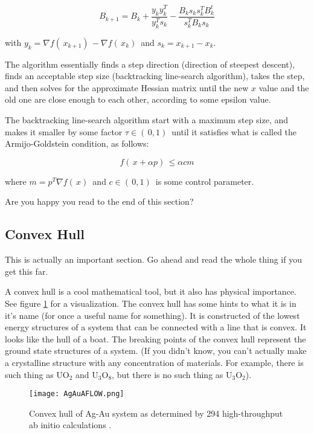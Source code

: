\documentclass{article}
\begin{document}
\begin{equation}
  B_{k+1}= B_k + \frac{y_k y_k^T}{y_k^T s_k} - \frac{B_k s_k s_k^T
    B_k^t}{s_k^T B_k s_k}
\end{equation}

\noindent
with $ y_k = \nabla f ( \, x_{k+1} ) \, - \nabla f ( \, x_k ) \, $ and $ s_k =
x_{k+1}-x_k $.

The algorithm essentially finds a step direction (direction of
steepest descent), finds an acceptable step size (backtracking line-search
algorithm), takes the step, and then solves for the approximate
Hessian matrix until the new $x$ value and the old one are close enough
to each other, according to some epsilon value.

The backtracking line-search algorithm start with a maximum step size,
and makes it smaller by some factor $ \tau \in ( \, 0,1 ) \, $ until it
satisfies what is called the Armijo-Goldstein condition, as follows:

\begin{equation}
  f ( \, x + \alpha p ) \, \leq \alpha c m
\end{equation}

\noindent
where $ m = p^T \nabla f ( \, x ) \, $ and $ c \in ( \, 0,1 ) \, $
is some control parameter.

Are you happy you read to the end of this section? 

\subsection{Convex Hull}
This is actually an important section. Go ahead and read the whole
thing if you get this far.

A convex hull is a cool mathematical tool, but it also has physical
importance. See figure \ref{fig:AgAuAFLOW} for a visualization. The
convex hull has some hints to what it is in it's name (for once a
useful name for something). It is constructed of the lowest energy
structures of a system that can be connected with a line that is
convex. It looks like the hull of a boat. The breaking points of the
convex hull represent the ground state structures of a system. (If you
didn't know, you can't actually make a crystalline structure with any
concentration of materials. For example, there is such thing as
$\mathrm{UO}_2$ and $\mathrm{U}_3\mathrm{O}_8$, but there is no such
thing as $\mathrm{U}_3\mathrm{O}_2$).

\begin{figure}[t!]
  \centering
  \texttt{[image: AgAuAFLOW.png]}
  \caption{Convex hull of Ag-Au system as determined by 294
    high-throughput ab initio calculations
    \cite{curtarolo2012aflowlib}. }
  \label{fig:AgAuAFLOW}
\end{figure}
\end{document}
